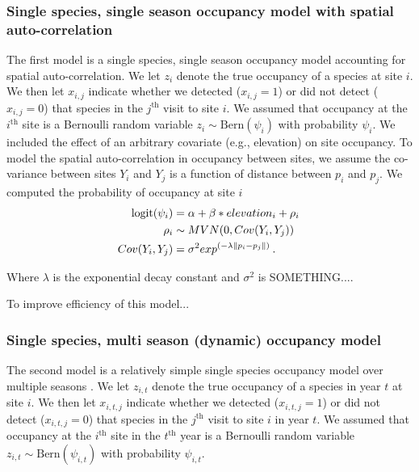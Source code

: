 \documentclass[12pt]{article}
\begin{document}
\subsubsection*{Single species, single season occupancy model with
  spatial auto-correlation}
The first model is a single species, single season occupancy model
accounting for spatial auto-correlation. We let $z_{i}$ denote the
true occupancy of a species at site $i$.  We then let $x_{i,j}$
indicate whether we detected ($x_{i,j}=1$) or did not detect
($x_{i,j}=0$) that species in the $j^{\mathrm{th}}$ visit to site $i$.
We assumed that occupancy at the $i^{\mathrm{th}}$ site is a Bernoulli
random variable $z_{i} \sim \mathrm{Bern}(\psi_{i})$ with probability
$\psi_{i}$.  We included the effect of an arbitrary covariate (e.g.,
elevation) on site occupancy. To model the spatial auto-correlation in
occupancy between sites, we assume the co-variance between sites $Y_i$
and $Y_j$ is a function of distance between $p_i$ and $p_j$. We
computed the probability of occupancy at site $i$
%
\begin{equation}
  \begin{split}
    \label{eq:spatial}
    \mathrm{logit}(\psi_{i}) &=
    \alpha + \beta*elevation_i + \rho_i\hspace{0.2em}\\
    \rho_i &\sim MVN(0, {Cov}(Y_i,Y_j)) \hspace{0.2em}\\
    {Cov} (Y_i,Y_j) &= \sigma^2exp^{(-\lambda\|p_i-p_j\|)} \hspace{0.2em}.\\
  \end{split}
\end{equation}
%

Where $\lambda$ is the exponential decay constant and $\sigma^2$ is
SOMETHING....

To improve efficiency of this model...

\subsubsection*{Single species, multi season (dynamic) occupancy
  model}
\label{sec:ssms}

The second model is a relatively simple single species occupancy model
over multiple seasons \citep{Royle2007}. We let $z_{i,t}$ denote the
true occupancy of a species in year $t$ at site $i$.  We then let
$x_{i,t,j}$ indicate whether we detected ($x_{i,t,j}=1$) or did not
detect ($x_{i,t,j}=0$) that species in the $j^{\mathrm{th}}$ visit to
site $i$ in year $t$.  We assumed that occupancy at the
$i^{\mathrm{th}}$ site in the $t^{\mathrm{th}}$ year is a Bernoulli
random variable $z_{i,t} \sim \mathrm{Bern}(\psi_{i,t})$ with
probability $\psi_{i,t}$.
\end{document}

